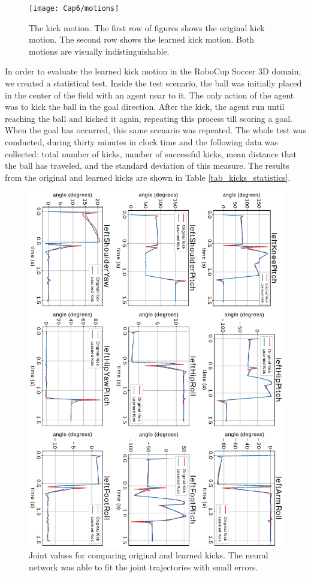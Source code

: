 \begin{figure}[H]
	\centering
	\texttt{[image: Cap6/motions]}
	\caption{The kick motion. The first row of figures shows the original kick motion. The second row shows the learned kick motion. Both motions are visually indistinguishable.}
	\label{fig:motions}
\end{figure} 

In order to evaluate the learned kick motion in the RoboCup Soccer 3D domain, we created a statistical test. Inside the test scenario, the ball was initially placed in the center of the field with an agent near to it. The only action of the agent was to kick the ball in the goal direction. After the kick, the agent run until reaching the ball and kicked it again, repeating this process till scoring a goal. When the goal has occurred, this same scenario was repeated. The whole test was conducted, during thirty minutes in clock time and the following data was collected: total number of kicks, number of successful kicks, mean distance that the ball has traveled, and the standard deviation of this measure. The results from the original and learned kicks are shown in Table \ref{tab_kicks_statistics}.


\begin{figure}[!htbp]
	\centering
	\includegraphics[angle=90,width=1\textwidth]{Cap6/kick_joints_curve}
	\caption{Joint values for comparing original and learned kicks. The neural network was able to fit the joint trajectories with small errors.}
	\label{fig:kick_joints_curves}
\end{figure}


